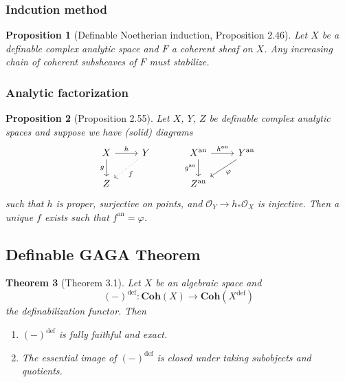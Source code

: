 \documentclass{amsart}
\newtheorem{theorem}{Theorem}[subsection]
\newtheorem{proposition}[theorem]{Proposition}
\theoremstyle{definition}
\numberwithin{equation}{section}
\newcommand{\definable}{\mathrm{def}}
\newcommand{\analytic}{\mathrm{an}}
\begin{document}
\subsubsection{Indcution method}
\begin{proposition}[Definable Noetherian induction, Proposition 2.46]
  Let $X$ be a definable complex analytic space and $F$ a coherent sheaf on $X$. 
  Any increasing chain of coherent subsheaves of $F$ must stabilize.
\end{proposition}

\subsubsection{Analytic factorization}
\begin{proposition}[Proposition 2.55]
  Let $X$, $Y$, $Z$ be definable complex analytic spaces and
  suppose we have (solid) diagrams
  \[
    \begin{tikzcd}
      X \ar[r,"h"] \ar[d,"g"'] & Y\ar[dl,"f",dotted] \\ Z 
    \end{tikzcd}
    \hspace*{30pt}
    \begin{tikzcd}
      X^{\analytic} \ar[r,"h^{\analytic}"] \ar[d,"g^{\analytic}"'] & Y^{\analytic}\ar[dl,"\varphi"] \\ Z^{\analytic}
    \end{tikzcd}
  \]
  such that $h$ is proper, surjective on points,
  and $\mathcal{O}_Y \to h_*\mathcal{O}_X$ is injective.
  Then a unique $f$ exists such that $f^{\analytic} = \varphi$.
\end{proposition}

\subsection{Definable GAGA Theorem}
\hfill
\begin{tcolorbox}[title = {\Large Goal}]
  \begin{theorem}[Theorem 3.1]
    \label{def GAGA}
    Let $X$ be an algebraic space and
    \[(-)^{\definable} : \mathbf{Coh}(X) \to \mathbf{Coh}(X^{\definable})\]
    the definabilization functor.
    Then 
    \begin{enumerate}[label = {(\arabic*)}]
      \item $(-)^{\definable}$ is fully faithful and exact.
      \item The essential image of $(-)^{\definable}$ is closed under taking subobjects and quotients.
    \end{enumerate}
  \end{theorem}    
\end{tcolorbox}
\end{document}
